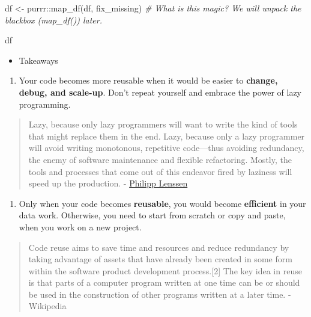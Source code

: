 \documentclass[
]{book}
\newenvironment{Shaded}{\begin{snugshade}}{\end{snugshade}}
\newcommand{\CommentTok}[1]{\textcolor[rgb]{0.56,0.35,0.01}{\textit{#1}}}
\newcommand{\FunctionTok}[1]{\textcolor[rgb]{0.00,0.00,0.00}{#1}}
\newcommand{\NormalTok}[1]{#1}
\newcommand{\OtherTok}[1]{\textcolor[rgb]{0.56,0.35,0.01}{#1}}
\newcommand{\SpecialCharTok}[1]{\textcolor[rgb]{0.00,0.00,0.00}{#1}}
\providecommand{\tightlist}{%
  \setlength{\itemsep}{0pt}\setlength{\parskip}{0pt}}
\begin{document}
\begin{Shaded}
\begin{Highlighting}[]
\NormalTok{df }\OtherTok{\textless{}{-}}\NormalTok{ purrr}\SpecialCharTok{::}\FunctionTok{map\_df}\NormalTok{(df, fix\_missing) }\CommentTok{\# What is this magic? We will unpack the blackbox (\textasciigrave{}map\_df()\textasciigrave{}) later.}

\NormalTok{df}
\end{Highlighting}
\end{Shaded}

\begin{itemize}
\tightlist
\item
  Takeaways
\end{itemize}

\begin{enumerate}
\def\labelenumi{\arabic{enumi}.}
\tightlist
\item
  Your code becomes more reusable when it would be easier to \textbf{change, debug, and scale-up}. Don't repeat yourself and embrace the power of lazy programming.
\end{enumerate}

\begin{quote}
Lazy, because only lazy programmers will want to write the kind of tools that might replace them in the end. Lazy, because only a lazy programmer will avoid writing monotonous, repetitive code---thus avoiding redundancy, the enemy of software maintenance and flexible refactoring. Mostly, the tools and processes that come out of this endeavor fired by laziness will speed up the production. - \href{http://blogoscoped.com/archive/2005-08-24-n14.html}{Philipp Lenssen}
\end{quote}

\begin{enumerate}
\def\labelenumi{\arabic{enumi}.}
\setcounter{enumi}{1}
\tightlist
\item
  Only when your code becomes \textbf{reusable}, you would become \textbf{efficient} in your data work. Otherwise, you need to start from scratch or copy and paste, when you work on a new project.
\end{enumerate}

\begin{quote}
Code reuse aims to save time and resources and reduce redundancy by taking advantage of assets that have already been created in some form within the software product development process.{[}2{]} The key idea in reuse is that parts of a computer program written at one time can be or should be used in the construction of other programs written at a later time. - Wikipedia
\end{quote}
\end{document}
